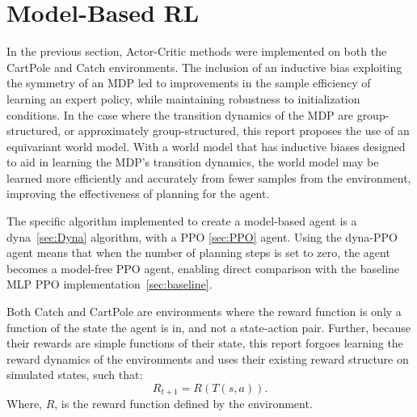 \section{Model-Based RL}\label{sec:model-based}
In the previous section, Actor-Critic methods were implemented on both the CartPole and Catch environments. The inclusion of an inductive bias exploiting the symmetry of an MDP led to improvements in the sample efficiency of learning an expert policy, while maintaining robustness to initialization conditions.
In the case where the transition dynamics of the MDP are group-structured, or approximately group-structured, this report proposes the use of an equivariant world model. With a world model that has inductive biases designed to aid in learning the MDP's transition dynamics, the world model may be learned more efficiently and accurately from fewer samples from the environment, improving the effectiveness of planning for the agent.

The specific algorithm implemented to create a model-based agent is a dyna~\ref{sec:Dyna} algorithm, with a PPO \ref{sec:PPO} agent. Using the dyna-PPO agent means that when the number of planning steps is set to zero, the agent becomes a model-free PPO agent, enabling direct comparison with the baseline MLP PPO implementation~\ref{sec:baseline}.

Both Catch and CartPole are environments where the reward function is only a function of the state the agent is in, and not a state-action pair. Further, because their rewards are simple functions of their state, this report forgoes learning the reward dynamics of the environments and uses their existing reward structure on simulated states, such that:
\begin{equation}
	R_{t+1} = R(T(s, a)).
\end{equation}
Where, $R$, is the reward function defined by the environment.

